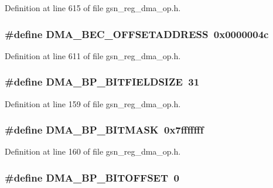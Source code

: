 Definition at line 615 of file gsn\_\-reg\_\-dma\_\-op.h.

\hypertarget{a00547_ad80e0c9431c46cb3e1fde5b2297b8ed1}{
\subsubsection[{DMA\_\-BEC\_\-OFFSETADDRESS}]{\setlength{\rightskip}{0pt plus 5cm}\#define DMA\_\-BEC\_\-OFFSETADDRESS~0x0000004c}}
\label{a00547_ad80e0c9431c46cb3e1fde5b2297b8ed1}


Definition at line 611 of file gsn\_\-reg\_\-dma\_\-op.h.

\hypertarget{a00547_af93275ca2ea7ba28fb05b3934cf992fc}{
\subsubsection[{DMA\_\-BP\_\-BITFIELDSIZE}]{\setlength{\rightskip}{0pt plus 5cm}\#define DMA\_\-BP\_\-BITFIELDSIZE~31}}
\label{a00547_af93275ca2ea7ba28fb05b3934cf992fc}


Definition at line 159 of file gsn\_\-reg\_\-dma\_\-op.h.

\hypertarget{a00547_ad2c65e3d63ad7b26cec172fdce245628}{
\subsubsection[{DMA\_\-BP\_\-BITMASK}]{\setlength{\rightskip}{0pt plus 5cm}\#define DMA\_\-BP\_\-BITMASK~0x7fffffff}}
\label{a00547_ad2c65e3d63ad7b26cec172fdce245628}


Definition at line 160 of file gsn\_\-reg\_\-dma\_\-op.h.

\hypertarget{a00547_a0d06b0e33818e8168abd28cf8d627170}{
\subsubsection[{DMA\_\-BP\_\-BITOFFSET}]{\setlength{\rightskip}{0pt plus 5cm}\#define DMA\_\-BP\_\-BITOFFSET~0}}
\label{a00547_a0d06b0e33818e8168abd28cf8d627170}


